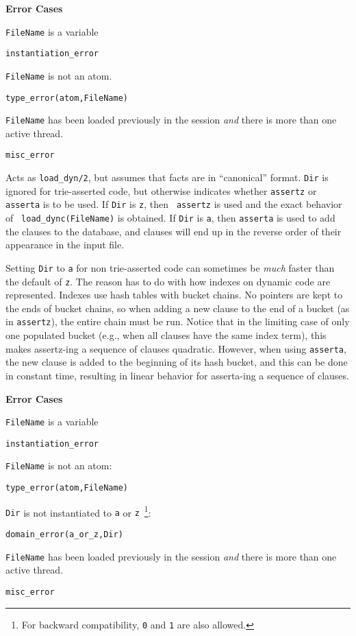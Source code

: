 \begin{description}
{\bf Error Cases}
\bi
\item 	{\tt FileName} is a variable
\bi
\item 	{\tt instantiation\_error}
\ei
\item 	{\tt FileName} is not an atom.
\bi
\item 	{\tt type\_error(atom,FileName)}
\ei
%
\item {\tt FileName} has been loaded previously in the session {\em and}
  there is more than one active thread.  
\bi
\item 	{\tt misc\_error}
\ei
\ei

\label{load_dync/2}
    Acts as {\tt load\_dyn/2}, but assumes that facts are in
    ``canonical'' format.  {\tt Dir} is ignored for trie-asserted
    code, but otherwise indicates whether {\tt assertz} or {\tt
    asserta} is to be used.  If {\tt Dir} is {\tt z}, then {\tt
    assertz} is used and the exact behavior of {\tt
    load\_dync(FileName)} is obtained.  If {\tt Dir} is {\tt a}, then
    {\tt asserta} is used to add the clauses to the database, and
    clauses will end up in the reverse order of their appearance in
    the input file.  

    Setting {\tt Dir} to {\tt a} for non trie-asserted code can
    sometimes be {\em much} faster than the default of {\tt z}.  The
    reason has to do with how indexes on dynamic code are represented.
    Indexes use hash tables with bucket chains.  No pointers are kept
    to the ends of bucket chains, so when adding a new clause to the
    end of a bucket (as in {\tt assertz}), the entire chain must be
    run.  Notice that in the limiting case of only one populated
    bucket (e.g., when all clauses have the same index term), this
    makes assertz-ing a sequence of clauses quadratic.  However, when
    using {\tt asserta}, the new clause is added to the beginning of
    its hash bucket, and this can be done in constant time, resulting
    in linear behavior for asserta-ing a sequence of clauses.

{\bf Error Cases}
\bi
\item 	{\tt FileName} is a variable
\bi
\item 	{\tt instantiation\_error}
\ei
\item 	{\tt FileName} is not an atom:
\bi
\item 	{\tt type\_error(atom,FileName)}
\ei
%
\item 	{\tt Dir} is not instantiated to {\tt a} or {\tt z}~\footnote{For
backward compatibility, {\tt 0} and {\tt 1} are also allowed.}: 
\bi
\item 	{\tt domain\_error(a\_or\_z,Dir)}
\ei
%
\item {\tt FileName} has been loaded previously in the session {\em and}
  there is more than one active thread.  
\bi
\item 	{\tt misc\_error}
\ei
\ei


\end{description}
